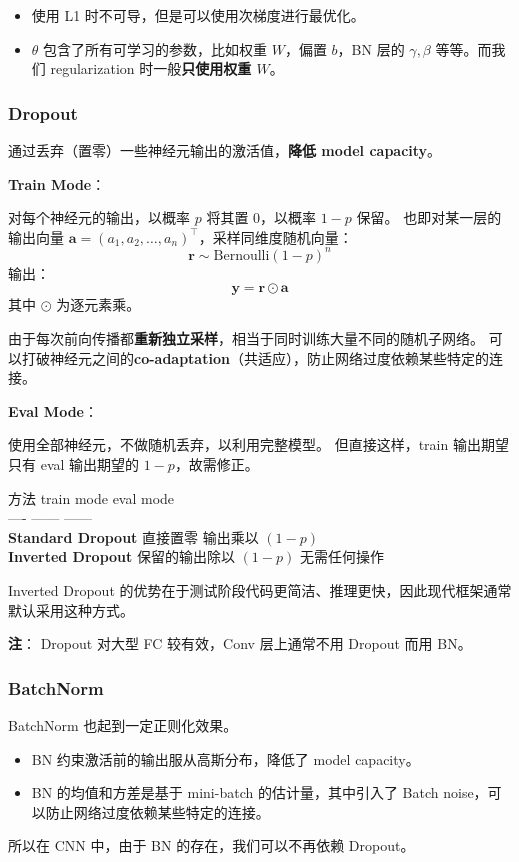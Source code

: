 \begin{itemize}
\tightlist
\item
  使用 L1 时不可导，但是可以使用次梯度进行最优化。
\item
  \(\theta\) 包含了所有可学习的参数，比如权重 \(W\)，偏置 \(b\)，BN 层的
  \(\gamma, \beta\) 等等。而我们 regularization 时一般\textbf{只使用权重
  \(W\)}。
\end{itemize}

\subsubsection{Dropout}\label{dropout}

通过丢弃（置零）一些神经元输出的激活值，\textbf{降低 model capacity}。

\textbf{Train Mode}：

对每个神经元的输出，以概率 \(p\) 将其置 0，以概率 \(1-p\) 保留。
也即对某一层的输出向量
\(\mathbf{a} = (a_1, a_2, \dots, a_n)^\top\)，采样同维度随机向量： \[
\mathbf{r} \sim \text{Bernoulli}(1-p)^n
\] 输出： \[
\mathbf{y} = \mathbf{r} \odot \mathbf{a}
\] 其中 \(\odot\) 为逐元素乘。

由于每次前向传播都\textbf{重新独立采样}，相当于同时训练大量不同的随机子网络。
可以打破神经元之间的\textbf{co-adaptation}（共适应），防止网络过度依赖某些特定的连接。

\textbf{Eval Mode}：

使用全部神经元，不做随机丢弃，以利用完整模型。 但直接这样，train
输出期望只有 eval 输出期望的 \(1-p\)，故需修正。

方法 \textbar{} train mode \textbar{} eval mode \textbar{}\\
---- \textbar{} ------ \textbar{} ------ \textbar{}\\
\textbf{Standard Dropout} \textbar{} 直接置零 \textbar{} 输出乘以
\((1-p)\) \textbar{}\\
\textbf{Inverted Dropout} \textbar{} 保留的输出除以 \((1-p)\) \textbar{}
无需任何操作 \textbar{}

Inverted Dropout
的优势在于测试阶段代码更简洁、推理更快，因此现代框架通常默认采用这种方式。

\textbf{注}： Dropout 对大型 FC 较有效，Conv 层上通常不用 Dropout 而用
BN。

\subsubsection{BatchNorm}\label{batchnorm}

BatchNorm 也起到一定正则化效果。

\begin{itemize}
\tightlist
\item
  BN 约束激活前的输出服从高斯分布，降低了 model capacity。
\item
  BN 的均值和方差是基于 mini-batch 的估计量，其中引入了 Batch
  noise，可以防止网络过度依赖某些特定的连接。
\end{itemize}

所以在 CNN 中，由于 BN 的存在，我们可以不再依赖 Dropout。

